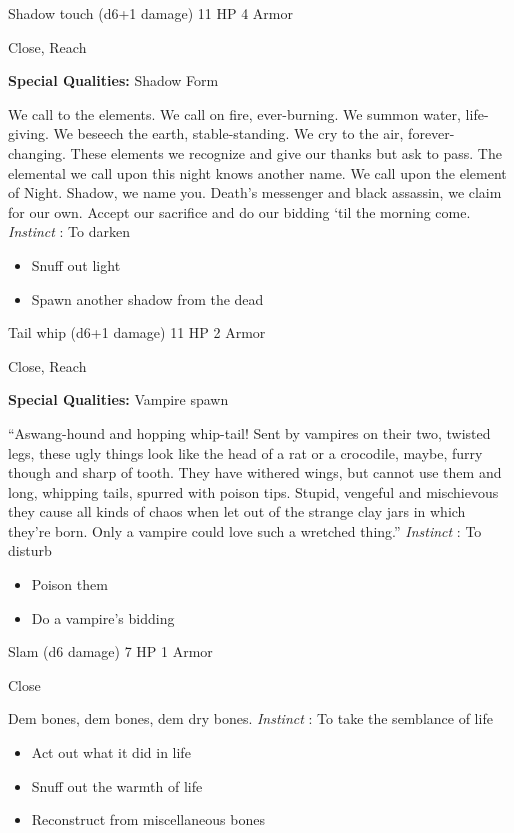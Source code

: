 

 Shadow touch (d6+1 damage) 11 HP 4 Armor


 Close, Reach


 \textbf{Special Qualities:}
 Shadow Form


 We call to the elements. We call on fire, ever-burning. We summon water, life-giving. We beseech the earth, stable-standing. We cry to the air, forever-changing. These elements we recognize and give our thanks but ask to pass. The elemental we call upon this night knows another name. We call upon the element of Night. Shadow, we name you. Death's messenger and black assassin, we claim for our own. Accept our sacrifice and do our bidding `til the morning come. \emph{Instinct}
: To darken
\begin{itemize}
\item Snuff out light
\item Spawn another shadow from the dead

\end{itemize}




 Tail whip (d6+1 damage) 11 HP 2 Armor


 Close, Reach


 \textbf{Special Qualities:}
 Vampire spawn


 ``Aswang-hound and hopping whip-tail! Sent by vampires on their two, twisted legs, these ugly things look like the head of a rat or a crocodile, maybe, furry though and sharp of tooth. They have withered wings, but cannot use them and long, whipping tails, spurred with poison tips. Stupid, vengeful and mischievous they cause all kinds of chaos when let out of the strange clay jars in which they're born. Only a vampire could love such a wretched thing.'' \emph{Instinct}
: To disturb
\begin{itemize}
\item Poison them
\item Do a vampire's bidding

\end{itemize}




 Slam (d6 damage) 7 HP 1 Armor


 Close


 Dem bones, dem bones, dem dry bones. \emph{Instinct}
: To take the semblance of life
\begin{itemize}
\item Act out what it did in life
\item Snuff out the warmth of life
\item Reconstruct from miscellaneous bones

\end{itemize}


